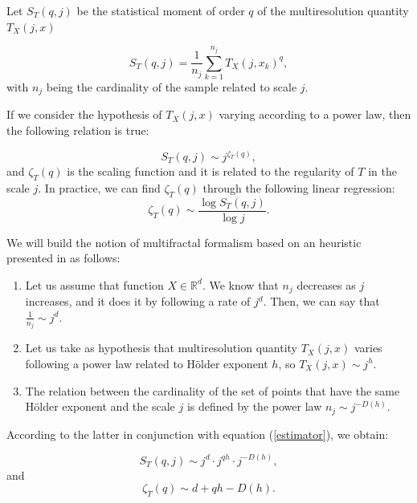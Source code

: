 \documentclass{article}
\begin{document}
Let $S_T(q, j)$ be the statistical moment of order $q$ of the multiresolution quantity $T_X(j, x)$

\begin{equation}\label{estimator}
	S_T(q, j) = \frac{1}{n_j}\displaystyle \sum_{k=1}^{n_j}T_X(j, x_k)^q,
\end{equation}
with $n_j$ being the cardinality of the sample related to scale $j$.

If we consider the hypothesis of $T_X(j, x)$ varying according to a power law, then the following relation is true:

\begin{equation}\label{relation}
	S_T(q, j) \sim j^{\zeta_T(q)},
\end{equation}
and $\zeta_T(q)$ is the scaling function and it is related to the regularity of $T$ in the scale $j$. In practice, we can find $\zeta_T(q)$ through the following linear regression:
\begin{equation}\label{linear_regression}
	\zeta_T(q) \sim \frac{\log{S_T(q, j)}}{\log{j}}.
\end{equation}

We will build the notion of multifractal formalism based on an heuristic presented in \citep{leonarduzzi2014analisis} as follows:

\begin{enumerate}
	\item Let us assume that function $X \in \mathbb{R}^d$. We know that $n_j$ decreases as $j$ increases, and it does it by following a rate of $j^d$. Then, we can say that $\frac{1}{n_j} \sim j^d$.
	\item Let us take as hypothesis that multiresolution quantity $T_X(j, x)$ varies following a power law related to H\"older exponent $h$, so $T_X(j, x) \sim j^h$.
	\item The relation between the cardinality of the set of points that have the same H\"older exponent and the scale $j$ is defined by the power law $n_j \sim j^{-D(h)}$. 
\end{enumerate}

According to the latter in conjunction with equation (\ref{estimator}), we obtain:

\begin{equation}
	S_T(q, j) \sim j^d \cdot j^{qh} \cdot j^{-D(h)},
\end{equation}
and 
\begin{equation}
	\zeta_T(q) \sim d + qh - D(h).
\end{equation}
\end{document}

